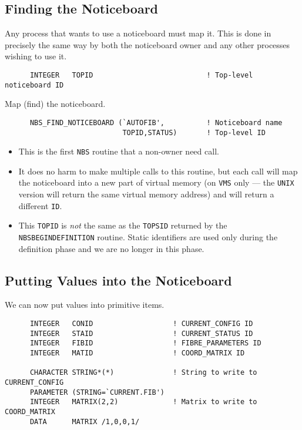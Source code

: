 \documentclass[twoside,11pt]{article}
\renewcommand{\_}{\texttt{\symbol{95}}}
\begin{document}
\subsection {Finding the Noticeboard}

Any process that wants to use a noticeboard must map it. This is done in
precisely the same way by both the noticeboard owner and any other processes
wishing to use it.

\begin {verbatim}
      INTEGER   TOPID                           ! Top-level noticeboard ID
\end{verbatim}

Map (find) the noticeboard.

\begin {verbatim}
      NBS_FIND_NOTICEBOARD (`AUTOFIB',          ! Noticeboard name
                            TOPID,STATUS)       ! Top-level ID
\end{verbatim}

\begin {itemize}
\item This is the first {\tt NBS} routine that a non-owner need call.
\item It does no harm to make multiple calls to this routine, but each call will
map the noticeboard into a new part of virtual memory (on {\tt VMS} only ---
the {\tt UNIX} version will return the same virtual memory address) and will 
return a different {\tt ID}.
\item This {\tt TOPID} is {\em not} the same as the {\tt TOPSID} returned by
the {\tt NBS\_BEGIN\_DEFINITION} routine. Static identifiers are used only
during the definition phase and we are no longer in this phase.
\end {itemize}

\subsection {Putting Values into the Noticeboard}

We can now put values into primitive items.

\begin {verbatim}
      INTEGER   CONID                   ! CURRENT_CONFIG ID
      INTEGER   STAID                   ! CURRENT_STATUS ID
      INTEGER   FIBID                   ! FIBRE_PARAMETERS ID
      INTEGER   MATID                   ! COORD_MATRIX ID

      CHARACTER STRING*(*)              ! String to write to CURRENT_CONFIG
      PARAMETER (STRING=`CURRENT.FIB')
      INTEGER   MATRIX(2,2)             ! Matrix to write to COORD_MATRIX
      DATA      MATRIX /1,0,0,1/
\end{verbatim}
\end{document}
